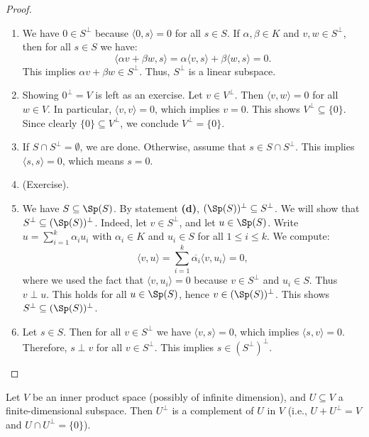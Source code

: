 \begin{proof}
\begin{enumerate}
    \item We have $0 \in S^\perp$ because $\langle 0, s \rangle = 0$ for all $s \in S$.
    If $\alpha, \beta \in K$ and $v, w \in S^\perp$, then for all $s \in S$ we have:
    \[ \langle \alpha v + \beta w, s \rangle = \alpha \langle v, s \rangle + \beta \langle w, s \rangle = 0. \]
    This implies $\alpha v + \beta w \in S^\perp$. Thus, $S^\perp$ is a linear subspace.
    
    \item Showing $0^\perp = V$ is left as an exercise. Let $v \in V^\perp$. Then $\langle v, w \rangle = 0$ for all $w \in V$. In particular, $\langle v, v \rangle = 0$, which implies $v = 0$. This shows $V^\perp \subseteq \{0\}$. Since clearly $\{0\} \subseteq V^\perp$, we conclude $V^\perp = \{0\}$.
    
    \item If $S \cap S^\perp = \emptyset$, we are done. Otherwise, assume that $s \in S \cap S^\perp$. This implies $\langle s, s \rangle = 0$, which means $s = 0$.
    
    \item (Exercise).
    
    \item We have $S \subseteq \Sp(S)$. By statement \textbf{(d)}, $(\Sp(S))^\perp \subseteq S^\perp$.
    We will show that $S^\perp \subseteq (\Sp(S))^\perp$. Indeed, let $v \in S^\perp$, and let $u \in \Sp(S)$. Write $u = \sum_{i=1}^k \alpha_i u_i$ with $\alpha_i \in K$ and $u_i \in S$ for all $1 \leq i \leq k$. We compute:
    \[ \langle v, u \rangle = \sum_{i=1}^k \overline{\alpha_i} \langle v, u_i \rangle = 0, \]
    where we used the fact that $\langle v, u_i \rangle = 0$ because $v \in S^\perp$ and $u_i \in S$. Thus $v \perp u$. This holds for all $u \in \Sp(S)$, hence $v \in (\Sp(S))^\perp$. This shows $S^\perp \subseteq (\Sp(S))^\perp$.
    
    \item Let $s \in S$. Then for all $v \in S^\perp$ we have $\langle v, s \rangle = 0$, which implies $\langle s, v \rangle = 0$. Therefore, $s \perp v$ for all $v \in S^\perp$. This implies $s \in (S^\perp)^\perp$.
\end{enumerate}
\end{proof}

\begin{theorem}
\label{thm:orthogonal_complement_finite_dim}
Let $V$ be an inner product space (possibly of infinite dimension), and $U \subseteq V$ a finite-di\-men\-sional subspace. Then $U^\perp$ is a complement of $U$ in $V$ (i.e., $U + U^\perp = V$ and $U \cap U^\perp = \{0\}$).
\end{theorem}

